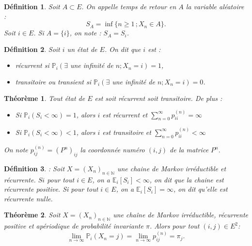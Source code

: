 \documentclass[12pt,a4paper]{report}
\newtheorem{thm}{Théorème}[section]
\newtheorem{definition}{Définition}[section]
\theoremstyle{remark}
\begin{document}
\begin{definition}\label{def2} 
Soit $A\subset E$. On appelle temps de retour en $A$ la variable aléatoire : $$S_A = \inf\{{n\geqslant 1} \, ; X_n \in A\}.$$
Soit $i \in E$. Si $A = \{i\}$, on note : $S_A = S_i$.
\end{definition}
\begin{definition}\label{defaaa}
Soit $i$ un état de $E$. On dit que $i$ est : 
\begin{itemize}
\item récurrent si  $\mathbb{P}_{i}\left(\exists\right.$ une infinité de $\left.n ; X_{n}=i\right)=1$,
\item transitoire ou transient si  $\mathbb{P}_{i}\left(\exists\right.$ une 
infinité de $\left.n ; X_{n}=i\right)=0$.
\end{itemize}
\end{definition}
\begin{thm}\label{th5}
Tout état de $E$ est soit récurrent soit transitoire. De plus :
\begin{itemize}
    \item Si $\mathbb{P}_i(S_i<\infty)=1$, alors $i$ est récurrent et $\sum\limits_{n=0}^{\infty} p_{ii}^{(n)}=\infty$
     \item Si $\mathbb{P}_i(S_i<\infty)<1$, alors $i$ est transitoire et $\sum\limits_{n=0}^{\infty} p_{ii}^{(n)}<\infty$
\end{itemize}
On note $p_{i j}^{(n)}=\left(P^{n}\right)_{i j}$ la coordonnée numéro $(i, j)$ de la matrice $P^{n}.$
\end{thm}
\begin{definition}\label{def21}: Soit $X=\left(X_{n}\right)_{n \in \mathbb{N}}$ une chaine de Markov irréductible et récurrente. $S i$ pour tout $i \in E$, on a $\mathbb{E}_{i}\left[S_{i}\right]<\infty$, on dit que la chaine est récurrente positive. Si pour tout $i \in E$, on a $\mathbb{E}_{i}\left[S_{i}\right]=\infty$, on dit qu'elle est récurrente nulle.
\end{definition}
\begin{thm}\label{th3}
Soit $X=(X_n)_{n \in \mathbb{N}}$ une chaîne de Markov irréductible, récurrente positive et apériodique de probabilité invariante $\pi$. Alors pour tout $(i,j) \in E^2$:
$$\lim\limits_{n \rightarrow \infty} \mathbb{P}_i(X_n = j) = \lim\limits_{n \rightarrow \infty} p^{(n)}_{ij} = \pi_j.$$
\end{thm}
\end{document}
